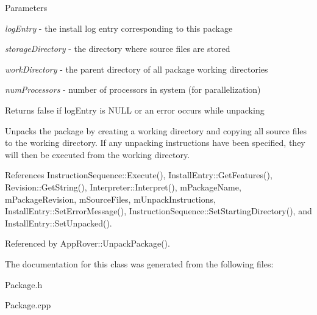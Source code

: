 \begin{DoxyParams}{Parameters}
\item[{\em logEntry}]-\/ the install log entry corresponding to this package \item[{\em storageDirectory}]-\/ the directory where source files are stored \item[{\em workDirectory}]-\/ the parent directory of all package working directories \item[{\em numProcessors}]-\/ number of processors in system (for parallelization) \end{DoxyParams}
\begin{DoxyReturn}{Returns}
false if logEntry is NULL or an error occurs while unpacking
\end{DoxyReturn}
Unpacks the package by creating a working directory and copying all source files to the working directory. If any unpacking instructions have been specified, they will then be executed from the working directory. 

References InstructionSequence::Execute(), InstallEntry::GetFeatures(), Revision::GetString(), Interpreter::Interpret(), mPackageName, mPackageRevision, mSourceFiles, mUnpackInstructions, InstallEntry::SetErrorMessage(), InstructionSequence::SetStartingDirectory(), and InstallEntry::SetUnpacked().



Referenced by AppRover::UnpackPackage().



The documentation for this class was generated from the following files:\begin{DoxyCompactItemize}
\item 
Package.h\item 
Package.cpp\end{DoxyCompactItemize}
